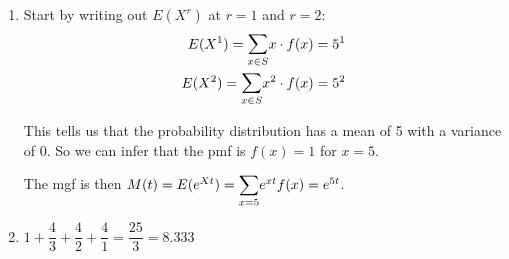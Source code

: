 \documentclass{article}
\begin{document}
\begin{enumerate}
\begin{enumerate}
	\end{enumerate}

      \item
	Start by writing out $E(X^r)$ at $r=1$ and $r=2$:
	\begin{align*}
	 E(X^1) = \mathlarger{\sum}_{x\in S}{x\cdot f(x)} = 5^1 \\
	 E(X^2) = \mathlarger{\sum}_{x\in S}{x^2 \cdot f(x)} = 5^2 
	\end{align*}
	
	This tells us that the probability distribution has a mean of 5 with a variance of 0. So we can
	infer that the pmf is $f(x) = 1$ for $x=5$. 
	
	The mgf is then $M(t) = E(e^{Xt}) = \mathlarger{\sum}_{x=5}{e^{xt}f(x)} = e^{5t}$.

      \addtocounter{enumi}{1}
      
      \item
	$1 + \dfrac{4}{3} + \dfrac{4}{2} + \dfrac{4}{1} = \dfrac{25}{3} = 8.333$
    \end{enumerate}
    
\end{document}
